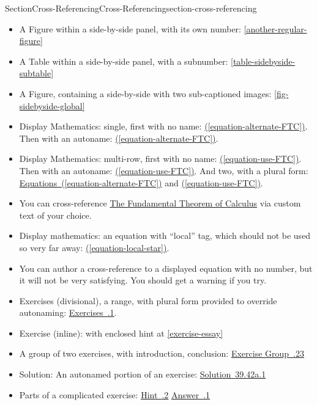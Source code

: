\documentclass[twoside,10pt,]{article}
\newcommand{\xreffont}{\relax}
\numberwithin{equation}{section}
\begin{document}
\begin{sectionptx}{Section}{Cross-Referencing}{}{Cross-Referencing}{}{}{section-cross-referencing}
\begin{itemize}[label=\textbullet]
\item{}A Figure within a side-by-side panel, with its own number: \hyperref[another-regular-figure]{{\xreffont\ref{another-regular-figure}}}%
\item{}A Table within a side-by-side panel, with a subnumber: \hyperref[table-sidebyside-subtable]{{\xreffont\ref{table-sidebyside-subtable}}}%
\item{}A Figure, containing a side-by-side with two sub-captioned images: \hyperref[fig-sidebyside-global]{{\xreffont\ref{fig-sidebyside-global}}}%
\item{}Display Mathematics: single, first with no name: \hyperref[equation-alternate-FTC]{({\xreffont\ref{equation-alternate-FTC}})}.  Then with an autoname: \hyperref[equation-alternate-FTC]{({\xreffont\ref{equation-alternate-FTC}})}.%
\item{}Display Mathematics: multi-row, first with no name: \hyperref[equation-use-FTC]{({\xreffont\ref{equation-use-FTC}})}.  Then with an autoname: \hyperref[equation-use-FTC]{({\xreffont\ref{equation-use-FTC}})}.  And two, with a plural form: \hyperref[equation-alternate-FTC]{Equations~({\xreffont\ref{equation-alternate-FTC}})} and \hyperref[equation-use-FTC]{({\xreffont\ref{equation-use-FTC}})}.%
\item{}You can cross-reference \hyperref[equation-use-FTC]{The Fundamental Theorem of Calculus} via custom text of your choice.%
\item{}Display mathematics: an equation with  ``local'' tag, which should not be used so very far away: \hyperref[equation-local-star]{({\xreffont\ref{equation-local-star}})}.%
\item{}You can author a cross-reference to a displayed equation with no number, but it will not be very satisfying.  You should get a warning if you try.%
\item{}Exercises (divisional), a range, with plural form provided to override autonaming: \hyperlink{exercises-null-problem}{Exercises~{\xreffont 11.2.1}\textendash{}{\xreffont 11.2.3}}.%
\item{}Exercise (inline): with enclosed hint at \hyperref[exercise-essay]{{\xreffont\ref{exercise-essay}}}%
\item{}A group of two exercises, with introduction, conclusion: \hyperlink{exercisegroup-two-problems}{Exercise Group~{\xreffont 11.2.2\textendash{}3}}%
\item{}Solution: An autonamed portion of an exercise: \hyperlink{solution-antiderivative}{Solution~{\xreffont 39.42a.1}}%
\item{}Parts of a complicated exercise: \hyperlink{exercise-complicated-second-hint}{Hint~{\xreffont 39.12.2}} \hyperlink{exercise-complicated-first-answer}{Answer~{\xreffont 39.12.1}}%

\end{itemize}
\end{sectionptx}
\end{document}
